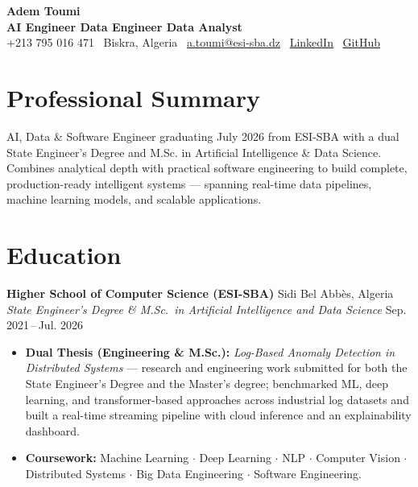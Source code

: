 \documentclass[10pt, letterpaper]{article}
\begin{document}
\begin{center}
  {\Huge\bfseries Adem Toumi}\\[4pt]
  {\large\bfseries AI Engineer \textbar{} Data Engineer \textbar{} Data Analyst}\\[6pt]
  {\small
    +213 795 016 471
    \textbar{}~Biskra, Algeria
    \textbar{}~\href{mailto:a.toumi@esi-sba.dz}{a.toumi@esi-sba.dz}
    \textbar{}~\href{https://www.linkedin.com/in/toumi-adem-a0b4342b7/}{LinkedIn}
    \textbar{}~\href{https://github.com/ademtoumi}{GitHub}
  }
\end{center}

\vspace{4pt}

\section{Professional Summary}
AI, Data \& Software Engineer graduating July 2026 from ESI-SBA with a dual State Engineer's Degree and M.Sc. in Artificial Intelligence \& Data Science. Combines analytical depth with practical software engineering to build complete, production-ready intelligent systems --- spanning real-time data pipelines, machine learning models, and scalable applications.

\section{Education}

\textbf{Higher School of Computer Science (ESI-SBA)} \hfill Sidi Bel Abb\`es, Algeria\\
\textit{State Engineer's Degree \& M.Sc.\ in Artificial Intelligence and Data Science} \hfill Sep. 2021\,--\,Jul. 2026
\begin{itemize}
  \item \textbf{Dual Thesis (Engineering \& M.Sc.):} \textit{Log-Based Anomaly Detection in Distributed Systems} --- research and engineering work submitted for both the State Engineer's Degree and the Master's degree; benchmarked ML, deep learning, and transformer-based approaches across industrial log datasets and built a real-time streaming pipeline with cloud inference and an explainability dashboard.
  \item \textbf{Coursework:} Machine Learning $\cdot$ Deep Learning $\cdot$ NLP $\cdot$ Computer Vision $\cdot$ Distributed Systems $\cdot$ Big Data Engineering $\cdot$ Software Engineering.
\end{itemize}
\end{document}
